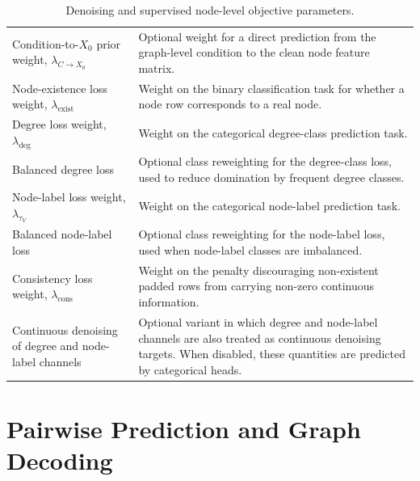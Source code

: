 \begin{table}[p]
\begin{tabularx}{\textwidth}{@{}p{}X@{}}
Condition-to-\(X_0\) prior weight, \(\lambda_{C\rightarrow X_0}\) & Optional weight for a direct prediction from the graph-level condition to the clean node feature matrix. \\
Node-existence loss weight, \(\lambda_{\mathrm{exist}}\) & Weight on the binary classification task for whether a node row corresponds to a real node. \\
Degree loss weight, \(\lambda_{\mathrm{deg}}\) & Weight on the categorical degree-class prediction task. \\
Balanced degree loss & Optional class reweighting for the degree-class loss, used to reduce domination by frequent degree classes. \\
Node-label loss weight, \(\lambda_{\tau_V}\) & Weight on the categorical node-label prediction task. \\
Balanced node-label loss & Optional class reweighting for the node-label loss, used when node-label classes are imbalanced. \\
Consistency loss weight, \(\lambda_{\mathrm{cons}}\) & Weight on the penalty discouraging non-existent padded rows from carrying non-zero continuous information. \\
Continuous denoising of degree and node-label channels & Optional variant in which degree and node-label channels are also treated as continuous denoising targets. When disabled, these quantities are predicted by categorical heads. \\
\bottomrule
\end{tabularx}
\caption{Denoising and supervised node-level objective parameters.}
\label{tab:generator-denoising-parameters}
\end{table}

\section{Pairwise Prediction and Graph Decoding}


